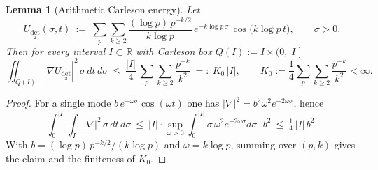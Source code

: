 \documentclass[11pt]{article}
\newtheorem{lemma}[theorem]{Lemma}
\theoremstyle{definition}
\theoremstyle{remark}
\theoremstyle{definition}
\newcommand{\R}{\mathbb{R}}
\begin{document}
\begin{lemma}[Arithmetic Carleson energy]\label{lem:carleson-arith}
Let
\[
 U_{\det_2}(\sigma,t)\ :=\ \sum_{p}\sum_{k\ge 2}\frac{(\log p)\,p^{-k/2}}{k\log p}\,e^{-k\log p\,\sigma}\,\cos\big(k\log p\,t\big),\qquad \sigma>0.
\]
Then for every interval $I\subset\R$ with Carleson box $Q(I):=I\times(0,|I|]$
\[
 \iint_{Q(I)} |\nabla U_{\det_2}|^2\,\sigma\,dt\,d\sigma\ \le\ \frac{|I|}{4}\,\sum_{p}\sum_{k\ge 2}\frac{p^{-k}}{k^2}
 \ =:\ K_0\,|I|,\qquad K_0:=\frac{1}{4}\sum_{p}\sum_{k\ge 2}\frac{p^{-k}}{k^2}<\infty.
\]
\end{lemma}
\begin{proof}
For a single mode $b\,e^{-\omega\sigma}\cos(\omega t)$ one has $|\nabla|^2=b^2\omega^2e^{-2\omega\sigma}$, hence
\[
 \int_0^{|I|}\!\int_I |\nabla|^2\,\sigma\,dt\,d\sigma\ \le\ |I|\cdot\sup_{\omega>0}\int_0^{|I|}\sigma\,\omega^2e^{-2\omega\sigma}d\sigma\cdot b^2\ \le\ \tfrac14\,|I|\,b^2.
\]
With $b=(\log p)\,p^{-k/2}/(k\log p)$ and $\omega=k\log p$, summing over $(p,k)$ gives the claim and the finiteness of $K_0$.
\end{proof}
\end{document}
